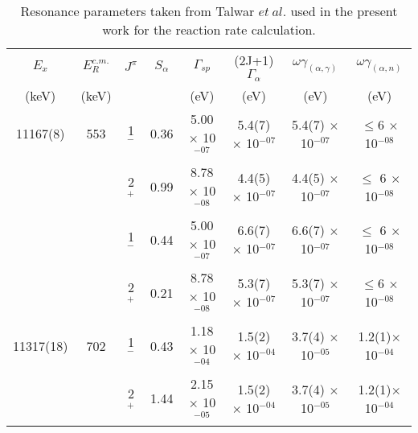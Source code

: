 \begin{table}[tpb]
    \setlength{\capwidth}{0.7\textwidth}
    \begin{centering}
       \caption{Resonance parameters taken from Talwar $et\ al.$\citep{Rashi2016} used in the present work for the reaction rate calculation. }
       \label{tb:wellknown_states}
       \begin{tabular}{c c c c c c c c}
       \toprule
       \toprule
              $E_x$        &    $E_R^{c.m.}$ &  $J^{\pi}$  &  $S_{\alpha}$   &    $\Gamma_{sp}$     &   (2J+1)$\Gamma_\alpha$     &    $\omega\gamma_{(\alpha,\gamma)}$  & $\omega\gamma_{(\alpha,n)}$           \\
              (keV)        &    (keV)       &     &    &  (eV)   &   (eV)  &  (eV)  &   (eV)   \\
             \hline
            11167(8)       &    553         &   1$^-$  &  0.36   & 5.00 $\times$ 10$^{-07}$   & 5.4(7) $\times$ 10$^{-07}$  & 5.4(7) $\times$ 10$^{-07}$ & $\leq$6 $\times$ 10$^{-08}$   \\
                           &                &   2$^+$  &  0.99   & 8.78 $\times$ 10$^{-08}$   & 4.4(5) $\times$ 10$^{-07}$  & 4.4(5) $\times$ 10$^{-07}$ & $\leq$ 6 $\times$ 10$^{-08}$   \\
                            &                 &   1$^-$  &  0.44   & 5.00 $\times$ 10$^{-07}$   & 6.6(7) $\times$ 10$^{-07}$  & 6.6(7) $\times$ 10$^{-07}$ &$\leq$ 6 $\times$ 10$^{-08}$   \\
                            &                &   2$^+$  &  0.21   & 8.78 $\times$ 10$^{-08}$   & 5.3(7) $\times$ 10$^{-07}$  & 5.3(7) $\times$ 10$^{-07}$ & $\leq$6 $\times$ 10$^{-08}$   \\
               11317(18)       &    702        &   1$^-$  &  0.43   & 1.18 $\times$ 10$^{-04}$   & 1.5(2) $\times$ 10$^{-04}$  & 3.7(4) $\times$ 10$^{-05}$ & 1.2(1)$\times$ 10$^{-04}$   \\
                            &                  &   2$^+$  &  1.44   & 2.15 $\times$ 10$^{-05}$   & 1.5(2) $\times$ 10$^{-04}$  & 3.7(4) $\times$ 10$^{-05}$ & 1.2(1)$\times$ 10$^{-04}$   \\

             \hline
         \hline
       \end{tabular}
     \end{centering}
\end{table}





